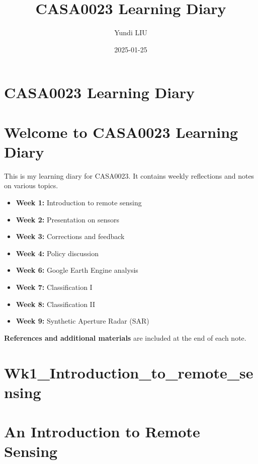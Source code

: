 \documentclass[
  letterpaper,
  DIV=11,
  numbers=noendperiod]{scrreprt}
\title{CASA0023 Learning Diary}
\author{Yundi LIU}
\date{2025-01-25}
\providecommand{\tightlist}{%
  \setlength{\itemsep}{0pt}\setlength{\parskip}{0pt}}\usepackage{longtable,booktabs,array}
\renewcommand*\contentsname{Table of contents}
\newcommand\contentsname{Table of contents}
\begin{document}
\maketitle

\renewcommand*\contentsname{Table of contents}
{
\hypersetup{linkcolor=}
\setcounter{tocdepth}{2}
\tableofcontents
}

\chapter{CASA0023 Learning Diary}\label{casa0023-learning-diary}


\chapter{Welcome to CASA0023 Learning
Diary}\label{welcome-to-casa0023-learning-diary}

This is my learning diary for CASA0023. It contains weekly reflections
and notes on various topics.

\begin{itemize}
\tightlist
\item
  \textbf{Week 1:} Introduction to remote sensing
\item
  \textbf{Week 2:} Presentation on sensors
\item
  \textbf{Week 3:} Corrections and feedback
\item
  \textbf{Week 4:} Policy discussion
\item
  \textbf{Week 6:} Google Earth Engine analysis
\item
  \textbf{Week 7:} Classification I
\item
  \textbf{Week 8:} Classification II
\item
  \textbf{Week 9:} Synthetic Aperture Radar (SAR)
\end{itemize}

\textbf{References and additional materials} are included at the end of
each note.


\chapter{Wk1\_Introduction\_to\_remote\_sensing}\label{wk1_introduction_to_remote_sensing}


\chapter{An Introduction to Remote
Sensing}\label{an-introduction-to-remote-sensing}
\end{document}
